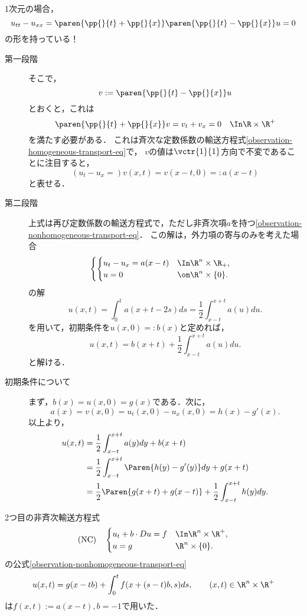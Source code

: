\documentclass[uplatex,dvipdfmx]{jsreport}
\begin{document}
\begin{observation}
    1次元の場合，
    \[u_{tt}-u_{xx}=\paren{\pp{}{t}+\pp{}{x}}\paren{\pp{}{t}-\pp{}{x}}u=0\]
    の形を持っている！
    \begin{description}
        \item[第一段階] そこで，
        \[v:=\paren{\pp{}{t}-\pp{}{x}}u\]
        とおくと，これは
        \[\paren{\pp{}{t}+\pp{}{x}}v=v_t+v_x=0\quad\In\R\times\R^+\]
        を満たす必要がある．
        これは斉次な定数係数の輸送方程式\ref{observation-homogeneous-transport-eq}で，
        $v$の値は$\vctr{1}{1}$方向で不変であることに注目すると，
        \[(u_t-u_x=)v(x,t)=v(x-t,0)=:a(x-t)\]
        と表せる．
        \item[第二段階] 上式は再び定数係数の輸送方程式で，ただし非斉次項$a$を持つ\ref{observation-nonhomogeneous-transport-eq}．
        この解は，外力項の寄与のみを考えた場合
        \[\begin{cases}
            \begin{cases}
                u_t-u_x=a(x-t)&\In\R^n\times\R_+,\\
                u=0&\on\R^n\times\{0\}.
            \end{cases}
        \end{cases}\]
        の解
        \[u(x,t)=\int^t_0a(x+t-2s)ds=\frac{1}{2}\int^{x+t}_{x-t}a(u)du.\]
        を用いて，初期条件を$u(x,0)=:b(x)$と定めれば，
        \[u(x,t)=b(x+t)+\frac{1}{2}\int^{x+t}_{x-t}a(u)du.\]
        と解ける．
        \item[初期条件について] まず，$b(x)=u(x,0)=g(x)$である．次に，
        \[a(x)=v(x,0)=u_t(x,0)-u_x(x,0)=h(x)-g'(x).\]
        以上より，
        \begin{align*}
            u(x,t)&=\frac{1}{2}\int^{x+t}_{x-t}a(y)dy+b(x+t)\\
            &=\frac{1}{2}\int^{x+t}_{x-t}\Paren{h(y)-g'(y)}dy+g(x+t)\\
            &=\frac{1}{2}\Paren{g(x+t)+g(x-t)}+\frac{1}{2}\int^{x+t}_{x-t}h(y)dy.
        \end{align*}
    \end{description}
\end{observation}
\begin{remark}
    2つ目の非斉次輸送方程式
    \[\text{(NC)}\quad\begin{cases}
        u_t+b\cdot Du=f&\In \R^n\times\R^+,\\
        u=g&\R^n\times\{0\}.
    \end{cases}\]
    の公式\ref{observation-nonhomogeneous-transport-eq}
    \[u(x,t)=g(x-tb)+\int^t_0f(x+(s-t)b,s)ds,\qquad (x,t)\in\R^n\times\R^+\]
    は$f(x,t):=a(x-t),b=-1$で用いた．
\end{remark}
\end{document}
